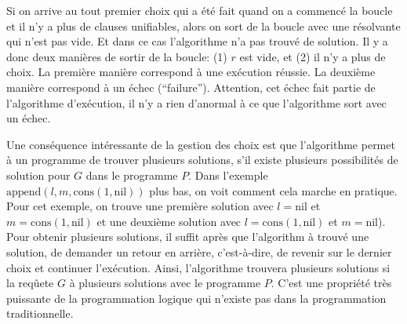 Si on arrive au tout premier choix qui a été fait quand on a commencé la boucle et il n'y a plus de clauses unifiables,
alors on sort de la boucle avec une résolvante qui n'est pas vide. Et dans ce cas l'algorithme n'a pas trouvé de solution. 
Il y a donc deux manières de sortir de la boucle: (1) $r$ est vide, et (2) il n'y a plus de choix.
La première manière correspond à une exécution réussie.
La deuxième manière correspond à un échec (``failure'').
Attention, cet échec fait partie de l'algorithme d'exécution, il n'y a rien d'anormal à ce que l'algorithme sort avec un échec.

Une conséquence intéressante de la gestion des choix est que
l'algorithme permet à un programme de trouver plusieurs solutions, s'il existe plusieurs possibilités
de solution pour $G$ dans le programme $P$.
Dans l'exemple $\mathrm{append}(l,m,\mathrm{cons}(1,\mathrm{nil}))$ plus bas,
on voit comment cela marche en pratique.
Pour cet exemple, on trouve une première solution avec $l=\mathrm{nil}$ et $m=\mathrm{cons}(1,\mathrm{nil})$ et une deuxième solution
avec $l=\mathrm{cons}(1,\mathrm{nil})$ et $m=\mathrm{nil}$).
Pour obtenir plusieurs solutions, il suffit après que l'algorithm à trouvé une solution,
de demander un retour en arrière, c'est-à-dire, de revenir sur le dernier choix et continuer l'exécution.
Ainsi, l'algorithme trouvera plusieurs solutions si la reqûete $G$ à plusieurs solutions avec le programme $P$.
C'est une propriété très puissante de la programmation logique qui n'existe pas dans la programmation traditionnelle.

